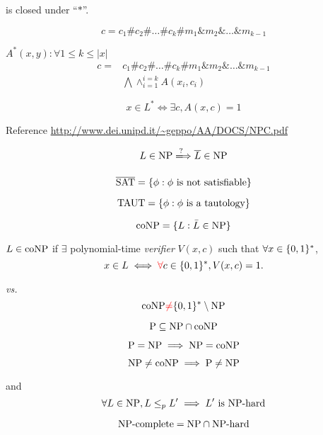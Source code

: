 \begin{frame}{\np}
  \begin{theorem}{}
	\np{} is closed under ``$\ast$''.
  \end{theorem}

  \[
	c = c_1\#c_2\#\dots\#c_k\#m_1\&m_2\&\dots\&m_{k-1}
  \]

  $A^{\ast}(x,y): \forall 1 \le k \le |x|$
  \begin{align*}
	c = &c_1\#c_2\#\dots\#c_k\#m_1\&m_2\&\dots\&m_{k-1} \\
	  &\bigwedge \land_{i=1}^{i=k} A(x_i, c_i)
  \end{align*}


  \[
	x \in L^{\ast} \iff \exists c, A(x,c) = 1
  \]

  \begin{alertblock}{Reference}
	\url{http://www.dei.unipd.it/~geppo/AA/DOCS/NPC.pdf}
  \end{alertblock}
\end{frame}
\begin{frame}{\conp{}}
  \[
	L \in \np \xLongrightarrow{?} \overline{L} \in \np
  \]

  \[
	\overline{\text{SAT}} = \{\phi: \phi \text{ is not satisfiable}\}
  \]

  \[
	\text{TAUT} = \{\phi: \phi \text{ is a tautology}\}
  \]

  \[
	\text{coNP} = \{L: \bar{L} \in \text{NP}\}
  \]

  \begin{definition}[\conp]
	$L \in \text{coNP}$ if $\exists$ polynomial-time \emph{verifier} $V(x,c)$ such that $\forall x \in \{0,1\}^{\ast}$,
	\[
	  x \in L \iff \textcolor{red}{\forall} c \in \{0,1\}^{\ast}, V(x,c) = 1.
	\]
  \end{definition}
\end{frame}
\begin{frame}{\np{} \emph{vs.} \conp{}}
  \[
	\text{coNP}{} \textcolor{red}{\neq} \{0,1\}^{\ast} \setminus \text{NP}
  \]

  \[
	\text{P} \subseteq \text{NP} \cap \text{coNP}
  \]

  \[
	\text{P} = \text{NP} \implies \text{NP} = \text{coNP}
  \]

  \[
	\text{NP} \neq \text{coNP} \implies \text{P} \neq \text{NP}
  \]
\end{frame}
\begin{frame}{\nph{} and \npc}
  \[
	\forall L \in \text{NP}, L \le_{p} L' \implies L' \text{ is } \text{NP-hard}
  \]

  \[
	\text{NP-complete} = \text{NP} \cap \text{NP-hard}
  \]
\end{frame}
